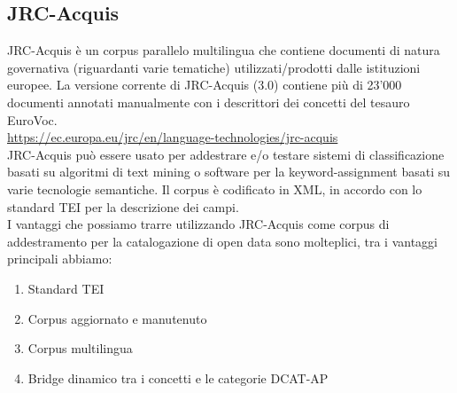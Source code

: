 \documentclass{article}
\theoremstyle{plain}
\theoremstyle{definition}
\begin{document}
\subsection{JRC-Acquis}
JRC-Acquis è un corpus parallelo multilingua che contiene documenti di natura governativa (riguardanti varie tematiche) utilizzati/prodotti dalle istituzioni europee.  
La versione corrente di JRC-Acquis (3.0) contiene più di 23'000 documenti annotati manualmente con i descrittori dei concetti del tesauro EuroVoc. 
\\
\url{https://ec.europa.eu/jrc/en/language-technologies/jrc-acquis}
\\
JRC-Acquis può essere usato per addestrare e/o testare sistemi di classificazione basati su algoritmi di text mining o software per la keyword-assignment basati su varie tecnologie semantiche. Il corpus è codificato in XML, in accordo con lo standard TEI per la descrizione dei campi.
\footnotemark
{}
\\
I vantaggi che possiamo trarre utilizzando JRC-Acquis come corpus di addestramento per la catalogazione di open data sono molteplici, tra i vantaggi principali abbiamo: 

\begin{enumerate}
\item Standard TEI
\item Corpus aggiornato e manutenuto
\item Corpus multilingua
\item Bridge dinamico tra i concetti e le categorie DCAT-AP
\end{enumerate}
\end{document}
